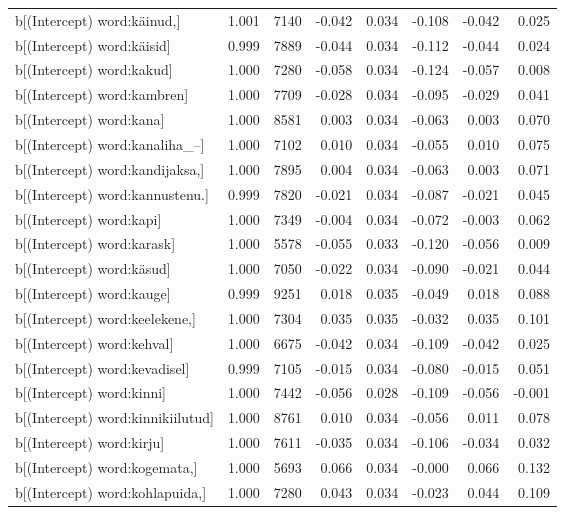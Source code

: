 \begin{longtable}{lrrrrrrr}
  b[(Intercept) word:käinud,] & 1.001 & 7140 & -0.042 & 0.034 & -0.108 & -0.042 & 0.025 \\ 
  b[(Intercept) word:käisid] & 0.999 & 7889 & -0.044 & 0.034 & -0.112 & -0.044 & 0.024 \\ 
  b[(Intercept) word:kakud] & 1.000 & 7280 & -0.058 & 0.034 & -0.124 & -0.057 & 0.008 \\ 
  b[(Intercept) word:kambren] & 1.000 & 7709 & -0.028 & 0.034 & -0.095 & -0.029 & 0.041 \\ 
  b[(Intercept) word:kana] & 1.000 & 8581 & 0.003 & 0.034 & -0.063 & 0.003 & 0.070 \\ 
  b[(Intercept) word:kanaliha\_–] & 1.000 & 7102 & 0.010 & 0.034 & -0.055 & 0.010 & 0.075 \\ 
  b[(Intercept) word:kandijaksa,] & 1.000 & 7895 & 0.004 & 0.034 & -0.063 & 0.003 & 0.071 \\ 
  b[(Intercept) word:kannustenu.] & 0.999 & 7820 & -0.021 & 0.034 & -0.087 & -0.021 & 0.045 \\ 
  b[(Intercept) word:kapi] & 1.000 & 7349 & -0.004 & 0.034 & -0.072 & -0.003 & 0.062 \\ 
  b[(Intercept) word:karask] & 1.000 & 5578 & -0.055 & 0.033 & -0.120 & -0.056 & 0.009 \\ 
  b[(Intercept) word:käsud] & 1.000 & 7050 & -0.022 & 0.034 & -0.090 & -0.021 & 0.044 \\ 
  b[(Intercept) word:kauge] & 0.999 & 9251 & 0.018 & 0.035 & -0.049 & 0.018 & 0.088 \\ 
  b[(Intercept) word:keelekene,] & 1.000 & 7304 & 0.035 & 0.035 & -0.032 & 0.035 & 0.101 \\ 
  b[(Intercept) word:kehval] & 1.000 & 6675 & -0.042 & 0.034 & -0.109 & -0.042 & 0.025 \\ 
  b[(Intercept) word:kevadisel] & 0.999 & 7105 & -0.015 & 0.034 & -0.080 & -0.015 & 0.051 \\ 
  b[(Intercept) word:kinni] & 1.000 & 7442 & -0.056 & 0.028 & -0.109 & -0.056 & -0.001 \\ 
  b[(Intercept) word:kinnikiilutud] & 1.000 & 8761 & 0.010 & 0.034 & -0.056 & 0.011 & 0.078 \\ 
  b[(Intercept) word:kirju] & 1.000 & 7611 & -0.035 & 0.034 & -0.106 & -0.034 & 0.032 \\ 
  b[(Intercept) word:kogemata,] & 1.000 & 5693 & 0.066 & 0.034 & -0.000 & 0.066 & 0.132 \\ 
  b[(Intercept) word:kohlapuida,] & 1.000 & 7280 & 0.043 & 0.034 & -0.023 & 0.044 & 0.109 \\ 

\end{longtable}
